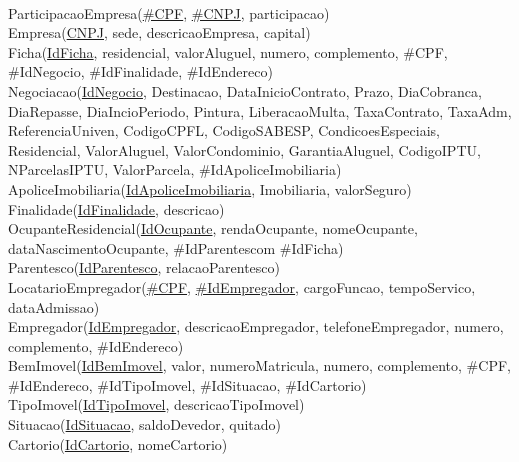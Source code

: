 \documentclass{article}
\begin{document}
        \\
        ParticipacaoEmpresa(\underline{\#CPF}, \underline{\#CNPJ}, participacao)
        \\
        Empresa(\underline{CNPJ}, sede, descricaoEmpresa, capital)
        \\
        Ficha(\underline{IdFicha}, residencial, valorAluguel, numero, complemento, \#CPF, \#IdNegocio, \#IdFinalidade, \#IdEndereco)
        \\
        Negociacao(\underline{IdNegocio}, Destinacao, DataInicioContrato, Prazo, DiaCobranca, DiaRepasse, DiaIncioPeriodo, Pintura, LiberacaoMulta, TaxaContrato, TaxaAdm, ReferenciaUniven, CodigoCPFL, CodigoSABESP, CondicoesEspeciais, Residencial, ValorAluguel, ValorCondominio, GarantiaAluguel, CodigoIPTU, NParcelasIPTU, ValorParcela, \#IdApoliceImobiliaria)
        \\
        ApoliceImobiliaria(\underline{IdApoliceImobiliaria}, Imobiliaria, valorSeguro)
        \\
        Finalidade(\underline{IdFinalidade}, descricao)
        \\
        OcupanteResidencial(\underline{IdOcupante}, rendaOcupante, nomeOcupante, dataNascimentoOcupante, \#IdParentescom \#IdFicha)
        \\
        Parentesco(\underline{IdParentesco}, relacaoParentesco)
        \\
        LocatarioEmpregador(\underline{\#CPF}, \underline{\#IdEmpregador}, cargoFuncao, tempoServico, dataAdmissao)
        \\
        Empregador(\underline{IdEmpregador}, descricaoEmpregador, telefoneEmpregador, numero, complemento, \#IdEndereco)
        \\
        BemImovel(\underline{IdBemImovel}, valor, numeroMatricula, numero, complemento, \#CPF, \#IdEndereco, \#IdTipoImovel, \#IdSituacao, \#IdCartorio)
        \\
        TipoImovel(\underline{IdTipoImovel}, descricaoTipoImovel)
        \\
        Situacao(\underline{IdSituacao}, saldoDevedor, quitado)
        \\
        Cartorio(\underline{IdCartorio}, nomeCartorio) 
        
        \pagebreak
\end{document}

